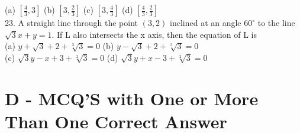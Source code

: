 \documentclass[12pt]{article}
\begin{document}
(a)  $[\frac{4}{3}, 3]$   \hspace{1cm}(b) $[3, \frac{2}{3}]$  \hspace{1cm}  (c)   $[3, \frac{4}{3}]$  \hspace{1cm}  (d)  $[\frac{4}{3}, \frac{2}{3}]$\\
23. A straight line through the point $(3,2)$ inclined at an angle $ 60^\circ $  to the line $\sqrt{3}x+y=1$. If L also intersects the x axis, then the equation of L is \\
(a) $y+\sqrt{3}+2+\sqrt[3]{3}=0$ \hspace{1cm} (b)   $y-\sqrt{3}+2+\sqrt[3]{3}=0$\\
(c)  $\sqrt{3}y-x+3+\sqrt[2]{3}=0$ \hspace{1cm} (d)   $\sqrt{3}y+x-3+\sqrt[2]{3}=0$\\

\section*{D -  MCQ'S with One or More Than One Correct Answer}
\end{document}
